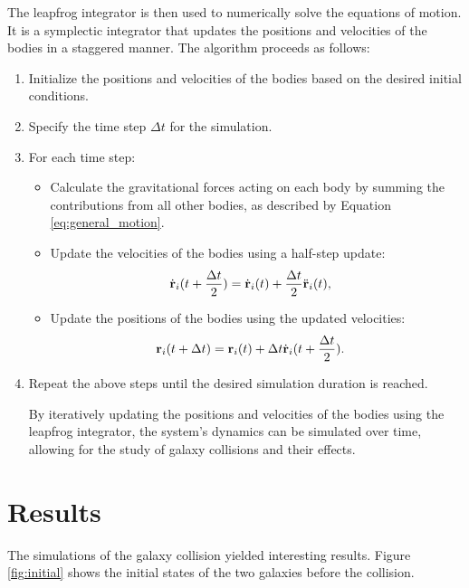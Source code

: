 \documentclass[reprint, amsmath, amssymb, aps]{revtex4-2}
\begin{document}
The leapfrog integrator is then used to numerically solve the equations of motion. It is a symplectic integrator that updates the positions and velocities of the bodies in a staggered manner. The algorithm proceeds as follows:
\begin{enumerate}
    \item Initialize the positions and velocities of the bodies based on the desired initial conditions.
    \item Specify the time step $\Delta t$ for the simulation.
    \item For each time step: \begin{itemize}
            \item Calculate the gravitational forces acting on each body by summing the contributions from all other bodies, as described by Equation \ref{eq:general_motion}.
            \item Update the velocities of the bodies using a half-step update:
            \begin{align*}
                \dot{{\bf r}}_i(t + \frac{\Delta t}{2}) &= \dot{{\bf r}}_i(t) + \frac{\Delta t}{2} \ddot{{\bf r}}_i(t),
            \end{align*}
            \item Update the positions of the bodies using the updated velocities:
            \begin{align*}
                {\bf r}_i(t + \Delta t) &= {\bf r}_i(t) + \Delta t \dot{{\bf r}}_i(t + \frac{\Delta t}{2}).
            \end{align*}
        \end{itemize}
    \item Repeat the above steps until the desired simulation duration is reached.

    By iteratively updating the positions and velocities of the bodies using the leapfrog integrator, the system's dynamics can be simulated over time, allowing for the study of galaxy collisions and their effects.
\end{enumerate}


\section{Results}

The simulations of the galaxy collision yielded interesting results. Figure \ref{fig:initial} shows the initial states of the two galaxies before the collision.
\end{document}
